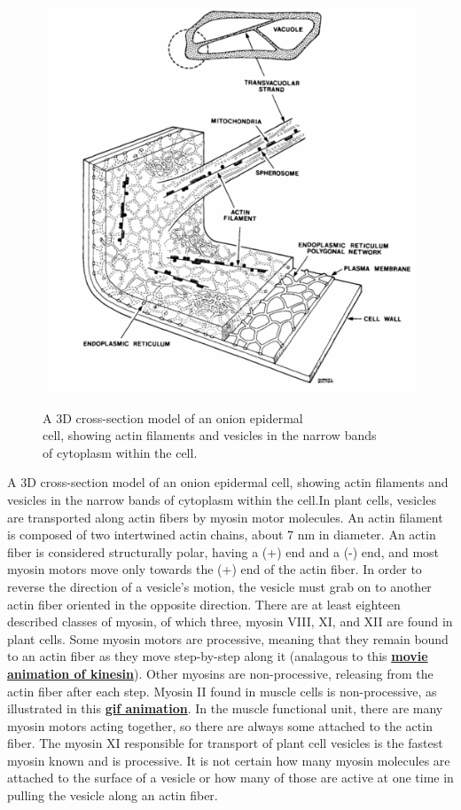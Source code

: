 \documentclass{../lab}
\begin{document}
\begin{figure}[h]
\captionsetup{justification=centering}
    \centering
    \href{http://experimentationlab.berkeley.edu/sites/default/files/images/500px-BMC_OnionStucture.gif}{\includegraphics[width=0.8\linewidth]{images/500px-BMC_OnionStucture.png}}
    \caption{A 3D cross-section model of an onion epidermal \\ cell, showing actin filaments and vesicles in the narrow bands \\ of cytoplasm within the cell.}
    \label{fig:500px-BMC_OnionStucture}
\end{figure}

A 3D cross-section model of an onion epidermal cell, showing actin filaments and vesicles in the narrow bands of cytoplasm within the cell.In plant cells, vesicles are transported along actin fibers by myosin motor molecules. An actin filament is composed of two intertwined actin chains, about 7 nm in diameter. An actin fiber is considered structurally polar, having a (+) end and a (-) end, and most myosin motors move only towards the (+) end of the actin fiber. In order to reverse the direction of a vesicle's motion, the vesicle must grab on to another actin fiber oriented in the opposite direction. There are at least eighteen described classes of myosin, of which three, myosin VIII, XI, and XII are found in plant cells. Some myosin motors are processive, meaning that they remain bound to an actin fiber as they move step-by-step along it (analagous to this \href{http://experimentationlab.berkeley.edu/sites/default/files/Kinesin_Motion.mp4}{\textbf{movie animation of kinesin}}). Other myosins are non-processive, releasing from the actin fiber after each step. Myosin II found in muscle cells is non-processive, as illustrated in this \href{http://physics111.lib.berkeley.edu/Physics111/Reprints/OTZ/actinmyosin.gif}{\textbf{gif animation}}.  In the muscle functional unit, there are many myosin motors acting together, so there are always some attached to the actin fiber. The myosin XI responsible for transport of plant cell vesicles is the fastest myosin known and is processive. It is not certain how many myosin molecules are attached to the surface of a vesicle or how many of those are active at one time in pulling the vesicle along an actin fiber.
\end{document}
